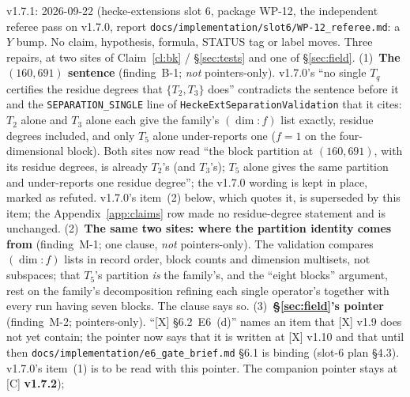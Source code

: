 \documentclass[11pt]{article}
\theoremstyle{remark}
\begin{document}
v1.7.1: 2026-09-22 (hecke-extensions slot 6, package WP-12, the independent
referee pass on v1.7.0, report \texttt{docs/implementation/slot6/WP-12\_referee.md}: a $Y$ bump.
No claim, hypothesis, formula, STATUS tag or label moves. Three repairs, at two sites of
Claim~\ref{cl:bk} / \S\ref{sec:tests} and one of \S\ref{sec:field}.
(1)~\textbf{The $(160,691)$ sentence} (finding~B-1; \emph{not} pointers-only). v1.7.0's
``no single $T_q$ certifies the residue degrees that $\{T_2,T_3\}$ does'' contradicts the
sentence before it and the \texttt{SEPARATION\_SINGLE} line of
\texttt{HeckeExtSeparationValidation} that it cites: $T_2$ alone and $T_3$ alone each give the
family's $(\dim{:}f)$ list exactly, residue degrees included, and only $T_5$ alone under-reports
one ($f=1$ on the four-dimensional block). Both sites now read ``the block partition at
$(160,691)$, with its residue degrees, is already $T_2$'s (and $T_3$'s); $T_5$ alone gives the
same partition and under-reports one residue degree''; the v1.7.0 wording is kept in place,
marked as refuted. v1.7.0's item~(2) below, which quotes it, is superseded by this item; the
Appendix~\ref{app:claims} row made no residue-degree statement and is unchanged.
(2)~\textbf{The same two sites: where the partition identity comes from} (finding~M-1; one
clause, \emph{not} pointers-only). The validation compares $(\dim{:}f)$ lists in record order,
block counts and dimension multisets, not subspaces; that $T_5$'s partition \emph{is} the
family's, and the ``eight blocks'' argument, rest on the family's decomposition refining each
single operator's together with every run having seven blocks. The clause says so.
(3)~\textbf{\S\ref{sec:field}'s pointer} (finding~M-2; pointers-only). ``[X] \S6.2~E6~(d)''
names an item that [X] v1.9 does not yet contain; the pointer now says that it is written at
[X] v1.10 and that until then \texttt{docs/implementation/e6\_gate\_brief.md} \S6.1 is binding
(slot-6 plan \S4.3). v1.7.0's item~(1) is to be read with this pointer.
The companion pointer stays at [C] \textbf{v1.7.2});
\end{document}
